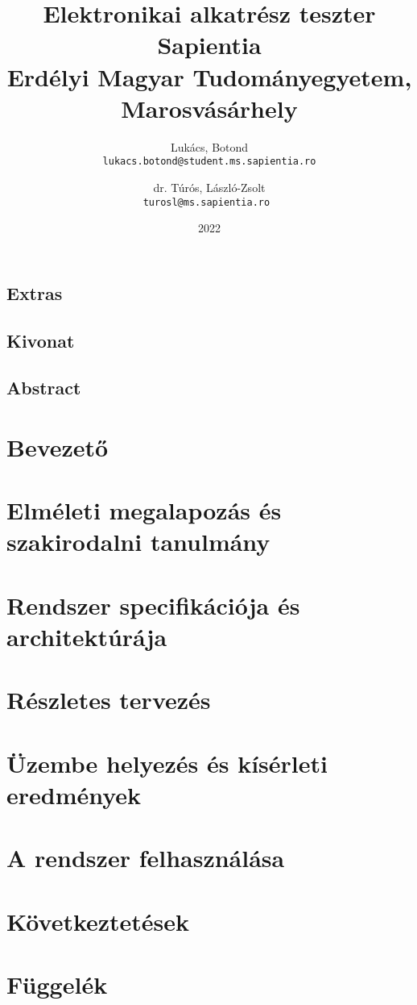 \documentclass[12pt, twosides]{report}
\title{
	{Elektronikai alkatrész teszter}\\
	{\large Sapientia\\
	Erdélyi Magyar Tudományegyetem, Marosvásárhely}
}
\author{
	Lukács, Botond\\
	\texttt{lukacs.botond@student.ms.sapientia.ro}
	\and
	dr. Túrós, László-Zsolt\\
	\texttt{turosl@ms.sapientia.ro }	
}
\date{2022}
\begin{document}


\section*{Extras}

\pagebreak



\section*{Kivonat}

\pagebreak

\section*{Abstract}

\pagebreak


\tableofcontents

\listoffigures

\chapter{Bevezető}


\chapter{Elméleti megalapozás és szakirodalni tanulmány}


\chapter{Rendszer specifikációja és architektúrája}


\chapter{Részletes tervezés}


\chapter{Üzembe helyezés és kísérleti eredmények}


\chapter{A rendszer felhasználása}


\chapter{Következtetések}






\appendix
\chapter{Függelék}

\end{document}
